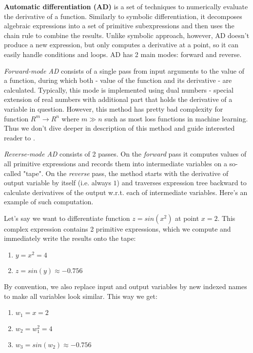 \documentclass[conference]{IEEEtran}
\begin{document}
\textbf{Automatic differentiation (AD)} is a set of techniques to
numerically evaluate the derivative of a function. Similarly to
symbolic differentiation, it decomposes algebraic expressions into a
set of primitive subexpressions and then uses the chain rule to
combine the results. Unlike symbolic approach, however, AD doesn't
produce a new expression, but only computes a derivative at a point,
so it can easily handle conditions and loops. AD has 2 main modes:
forward and reverse.

\textit{Forward-mode AD} consists of a single pass from input
arguments to the value of a function, during which both - value of the
function and its derivative - are calculated. Typically, this mode is
implemented using dual numbers - special extension of real numbers
with additional part that holds the derivative of a variable in
question. However, this method has pretty bad complexity for function
$R^m \to R^n$ where $m \gg n$ such as most loss functions in machine
learning. Thus we don't dive deeper in description of this method and
guide interested reader to \cite{Stan}.

\textit{Reverse-mode AD} consists of 2 passes. On the \textit{forward}
pass it computes values of all primitive expressions and records them
into intermediate variables on a so-called "tape". On the
\textit{reverse} pass, the method starts with the derivative of output
variable by itself (i.e. always $1$) and traverses expression tree
backward to calculate derivatives of the output w.r.t. each of
intermediate variables. Here's an example of such computation.

Let's say we want to differentiate function $z = sin(x^2)$ at point
$x = 2$. This complex expression contains 2 primitive expressions,
which we compute and immediately write the results onto the tape:

\begin{enumerate}
\item $y = x^2 = 4$
\item $z = sin(y) \approx -0.756$
\end{enumerate}

By convention, we also replace input and output variables by new
indexed names to make all variables look similar. This way we get:

\begin{enumerate}
\item $w_1 = x = 2$
\item $w_2 = w_1^2 = 4$
\item $w_3 = sin(w_2) \approx -0.756$
\end{enumerate}
\end{document}
